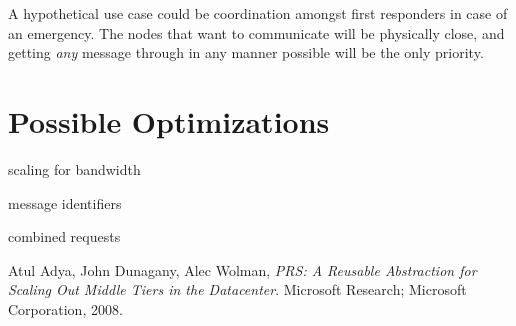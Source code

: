 \documentclass[11pt]{article}
\begin{document}
A hypothetical use case could be coordination amongst first responders in case of an emergency. The nodes that want to communicate will be physically close, and getting \emph{any} message through in any manner possible will be the only priority.

\section{Possible Optimizations}
scaling for bandwidth
   
message identifiers
   
combined requests

   
\begin{thebibliography}{1}

    Atul Adya, John Dunagany, Alec Wolman,
    \emph{PRS: A Reusable Abstraction for Scaling Out Middle Tiers in the Datacenter}.
    Microsoft Research; Microsoft Corporation,
    2008.
\end{thebibliography}
\end{document}
